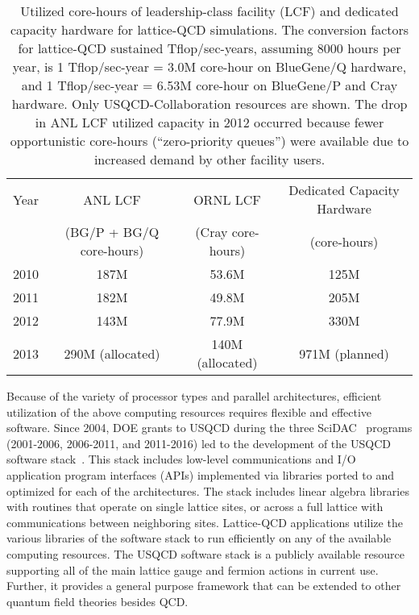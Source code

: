 \begin{table}[t]
\begin{center}
\caption{Utilized core-hours of leadership-class facility
(LCF) and dedicated capacity hardware for lattice-QCD simulations.  The
conversion factors for lattice-QCD sustained Tflop/sec-years, assuming 8000
hours per year, is 1 Tflop/sec-year = 3.0M core-hour on BlueGene/Q hardware, and 1 Tflop/sec-year = 6.53M core-hour on
BlueGene/P and Cray hardware. Only USQCD-Collaboration resources are shown.
The drop in ANL LCF utilized capacity in 2012 occurred
because fewer opportunistic core-hours (``zero-priority queues'') were
available due to increased demand by other facility users.
\vspace{1.5mm}}
\label{tab:current}
\begin{tabular}{lccc}  
\hline\hline
Year & ANL LCF & ORNL LCF & Dedicated Capacity Hardware \\[-0.75mm]
& (BG/P + BG/Q core-hours) & (Cray core-hours) & (core-hours) \\[0.5mm]  \hline
2010 & 187M & 53.6M & 125M \\
2011 & 182M & 49.8M & 205M \\
2012 & 143M & 77.9M & 330M \\
2013 & 290M (allocated) & 140M (allocated) & 971M (planned) \\ \hline\hline
\end{tabular}
\end{center}
\end{table}

Because of the variety of processor types and parallel architectures,
efficient utilization of the above computing resources requires flexible and
effective software.  Since 2004, DOE grants to USQCD during the three
SciDAC~\cite{SciDAC} programs (2001-2006, 2006-2011, and 2011-2016) led to the
development of the USQCD software stack~\cite{SciDAC-software}.  This stack
includes low-level communications and I/O application program interfaces
(APIs) implemented via libraries ported to and optimized for each of the
architectures.  The stack includes linear algebra libraries with routines that
operate on single lattice sites, or across a full lattice with communications
between neighboring sites.  Lattice-QCD applications utilize the various
libraries of the software stack to run efficiently on any of the available
computing resources.  The USQCD software stack is a publicly available
resource supporting all of the main lattice gauge and fermion actions in
current use.  Further, it provides a general purpose framework that can be
extended to other quantum field theories besides QCD.

